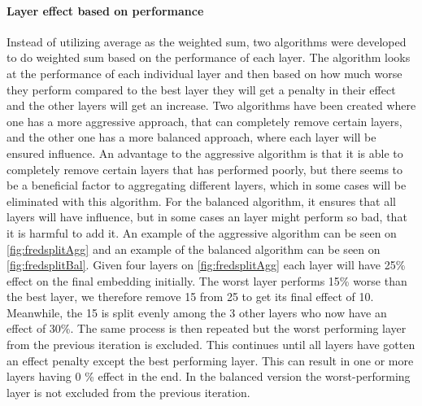 \paragraph{Layer effect based on performance} \label{fredsplit}
Instead of utilizing average as the weighted sum, two algorithms were developed to do weighted sum based on the performance of each layer.
The algorithm looks at the performance of each individual layer and then based on how much worse they perform compared to the best layer they will get a penalty in their effect and the other layers will get an increase.
Two algorithms have been created where one has a more aggressive approach, that can completely remove certain layers, and the other one has a more balanced approach, where each layer will be ensured influence.
An advantage to the aggressive algorithm is that it is able to completely remove certain layers that has performed poorly, but there seems to be a beneficial factor to aggregating different layers, which in some cases will be eliminated with this algorithm.
For the balanced algorithm, it ensures that all layers will have influence, but in some cases an layer might perform so bad, that it is harmful to add it.
An example of the aggressive algorithm can be seen on \autoref{fig:fredsplitAgg} and an example of the balanced algorithm can be seen on \autoref{fig:fredsplitBal}.
Given four layers on \autoref{fig:fredsplitAgg} each layer will have 25\% effect on the final embedding initially.
The worst layer performs 15\% worse than the best layer, we therefore remove 15 from 25 to get its final effect of 10.
Meanwhile, the 15 is split evenly among the 3 other layers who now have an effect of 30\%.
The same process is then repeated but the worst performing layer from the previous iteration is excluded.
This continues until all layers have gotten an effect penalty except the best performing layer.
This can result in one or more layers having 0 \% effect in the end.
In the balanced version the worst-performing layer is not excluded from the previous iteration.
